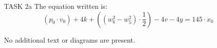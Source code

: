 TASK 2a  
The equation written is:  
\[
(p_0 \cdot v_0) + 4k + \left( (w_6^2 - w_5^2) \cdot \frac{1}{2} \right) - 4v - 4y = 145 \cdot x_0
\]  

No additional text or diagrams are present.